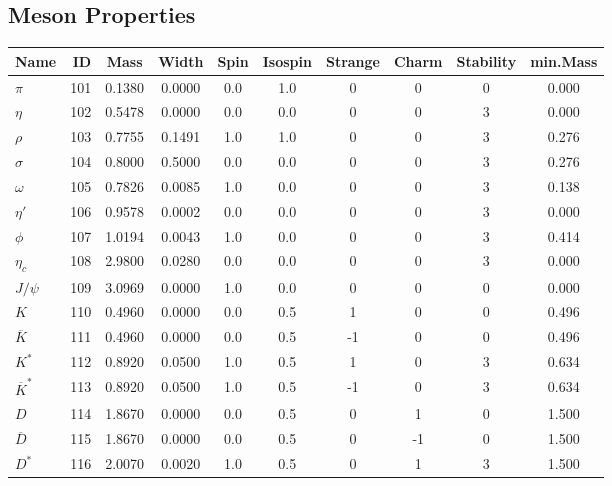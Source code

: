 \documentclass[a4paper,10pt]{article}
\begin{document}
\pagestyle{empty}
\setcounter{section}{1}
\setcounter{subsection}{0}
\subsection{Meson Properties}
\begin{tabular}{lrcccccccc} 
\toprule
\textbf{Name}&\textbf{ID}&\textbf{Mass}&\textbf{Width}&\textbf{Spin}&
\textbf{Isospin}&\textbf{Strange}&\textbf{Charm}&\textbf{Stability}&\textbf{min.Mass} \\
\midrule
$\pi           $  & 101 & 0.1380 & 0.0000 &  0.0 &  1.0 &  0 &  0 &  0& 0.000\\
$\eta          $  & 102 & 0.5478 & 0.0000 &  0.0 &  0.0 &  0 &  0 &  3& 0.000\\
$\rho          $  & 103 & 0.7755 & 0.1491 &  1.0 &  1.0 &  0 &  0 &  3& 0.276\\
$\sigma        $  & 104 & 0.8000 & 0.5000 &  0.0 &  0.0 &  0 &  0 &  3& 0.276\\
$\omega        $  & 105 & 0.7826 & 0.0085 &  1.0 &  0.0 &  0 &  0 &  3& 0.138\\
$\eta'         $  & 106 & 0.9578 & 0.0002 &  0.0 &  0.0 &  0 &  0 &  3& 0.000\\
$\phi          $  & 107 & 1.0194 & 0.0043 &  1.0 &  0.0 &  0 &  0 &  3& 0.414\\
$\eta_c        $  & 108 & 2.9800 & 0.0280 &  0.0 &  0.0 &  0 &  0 &  3& 0.000\\
$J/\psi        $  & 109 & 3.0969 & 0.0000 &  1.0 &  0.0 &  0 &  0 &  0& 0.000\\
\midrule
$K             $  & 110 & 0.4960 & 0.0000 &  0.0 &  0.5 &  1 &  0 &  0& 0.496\\
$\overline{K}  $  & 111 & 0.4960 & 0.0000 &  0.0 &  0.5 & -1 &  0 &  0& 0.496\\
$K^*           $  & 112 & 0.8920 & 0.0500 &  1.0 &  0.5 &  1 &  0 &  3& 0.634\\
$\overline{K}^*$  & 113 & 0.8920 & 0.0500 &  1.0 &  0.5 & -1 &  0 &  3& 0.634\\
\midrule
$D             $  & 114 & 1.8670 & 0.0000 &  0.0 &  0.5 &  0 &  1 &  0& 1.500\\
$\overline{D}  $  & 115 & 1.8670 & 0.0000 &  0.0 &  0.5 &  0 & -1 &  0& 1.500\\
$D^*           $  & 116 & 2.0070 & 0.0020 &  1.0 &  0.5 &  0 &  1 &  3& 1.500\\

\end{tabular}
\end{document}
